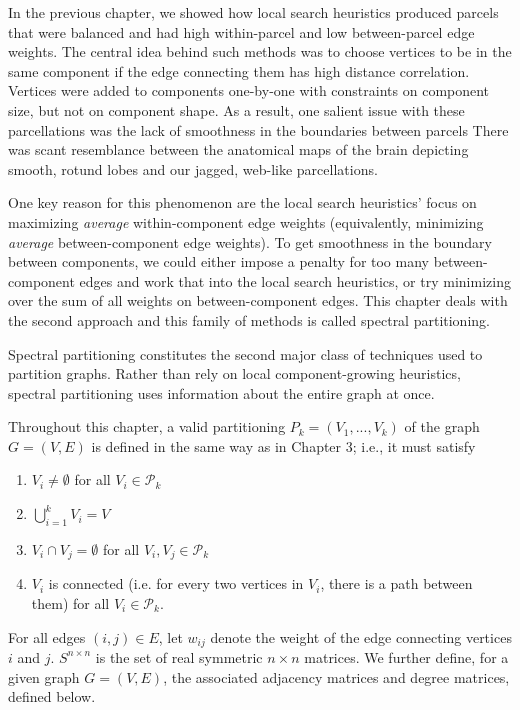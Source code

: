 In the previous chapter, we showed how local search heuristics produced
parcels that were balanced and had high within-parcel and low
between-parcel edge weights. The central idea behind such methods
was to choose vertices to be in the same component if the edge
connecting them has high distance correlation. Vertices were added to
components one-by-one with constraints on component size, but not on
component shape. As a result, one salient issue with these
parcellations was the lack of smoothness in the boundaries between parcels
There was scant resemblance between the anatomical maps
of the brain depicting smooth, rotund lobes and our jagged, web-like
parcellations.

One key reason for this phenomenon are the local search heuristics'
focus on maximizing \textit{average} within-component edge weights
(equivalently, minimizing \textit{average} between-component edge
weights). To get smoothness in the boundary between components, we
could either impose a penalty for too many between-component edges and
work that into the local search heuristics, or try minimizing over the
sum of all weights on between-component edges. This chapter deals with
the second approach and this family of methods is called spectral
partitioning.

Spectral partitioning constitutes the second major class of techniques
used to partition graphs. Rather than rely on local component-growing
heuristics, spectral partitioning uses information about the entire
graph at once.

Throughout this chapter, a valid partitioning
$P_k = (V_1, ..., V_k)$ of the graph $G = (V, E)$ is defined in the
same way as in Chapter 3; i.e., it must satisfy

\begin{enumerate}[1.]
\item
$V_i \neq \emptyset$ for all $V_i \in \mathcal{P}_k$

\item
$\bigcup\limits_{i=1}^k V_i = V$

\item
$V_i \cap V_j = \emptyset$ for all $V_i, V_j \in \mathcal{P}_k$

\item
$V_i$ is connected (i.e. for every two vertices in $V_i$, there is a
path between them) for all $V_i \in \mathcal{P}_k$.
\end{enumerate}

For all edges $(i,j) \in E$, let $w_{ij}$ denote the weight of the edge
connecting vertices $i$ and $j$.
$S^{n \times n}$ is the set of real symmetric $n \times n$ matrices.
We further define, for a given graph $G = (V, E)$, the associated
adjacency matrices and degree matrices, defined below.

